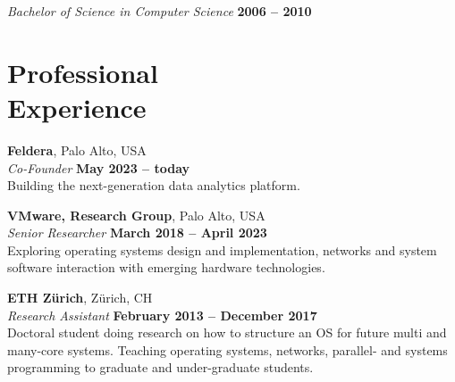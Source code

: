 \documentclass[margin,line]{cv/cv}
\begin{document}
\begin{resume}
    \textsl{Bachelor of Science in Computer Science} \hfill \textbf{2006 -- 2010}\vspace{-3mm}\\\vspace{-1mm}%


    \section{\mysidestyle Professional\\Experience}

    \textbf{Feldera}, Palo Alto, USA \vspace{2mm}\\\vspace{1mm}%
    \textsl{Co-Founder} \hfill \textbf{May 2023 -- today}\\
    Building the next-generation data analytics platform.

    \textbf{VMware, Research Group}, Palo Alto, USA \vspace{2mm}\\\vspace{1mm}%
    \textsl{Senior Researcher} \hfill \textbf{March 2018 -- April 2023}\\
    Exploring operating systems design and implementation, networks
    and system software interaction with emerging hardware technologies.

    \textbf{ETH Zürich}, Zürich, CH \vspace{2mm}\\\vspace{1mm}%
    \textsl{Research Assistant} \hfill \textbf{February 2013 -- December 2017}\\
    Doctoral student doing research on how to structure an OS for future multi and
    many-core systems. Teaching operating systems, networks, parallel- and systems programming
    to graduate and under-graduate students.


\end{resume}
\end{document}
